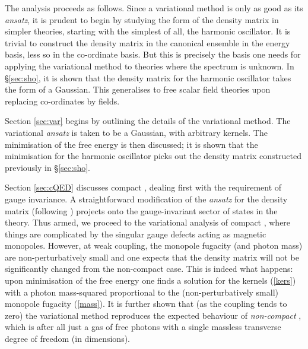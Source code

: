 \documentclass[a4paper,a4paper]{article}
\begin{document}
The analysis proceeds as follows. Since a variational method is only as good as its \emph{ansatz},
it is prudent to begin by studying the form of the density matrix in simpler theories, 
starting with the simplest of all, the harmonic oscillator. It is trivial to construct the density matrix in the
canonical ensemble in the energy basis, less so in the co-ordinate basis. 
But this is precisely the basis one needs for applying the variational method to theories where the spectrum is unknown. 
In \S\ref{sec:sho}, it is shown that the density matrix for the harmonic oscillator takes the form of a Gaussian.
This generalises to free scalar field theories upon replacing co-ordinates by fields.

Section \ref{sec:var} begins by outlining the details of the variational method. 
The variational \emph{ansatz} is taken to be a Gaussian, with arbitrary kernels. 
The minimisation of the free energy is then discussed; it is shown that the minimisation for the harmonic oscillator
picks out the density matrix constructed previously in \S\ref{sec:sho}. 

Section \ref{sec:cQED} discusses compact \coordHE{}, dealing first
with the requirement of gauge invariance.
A straightforward modification of the \emph{ansatz} for the density matrix (following \cite{Kogan:2002yr}) projects
onto the gauge-invariant sector of states in the theory. 
Thus armed, we proceed to the variational analysis of compact \coordHE{}, where things are complicated by the singular gauge defects
acting as magnetic monopoles. However, at weak coupling, the monopole fugacity (and photon mass)
are non-perturbatively small and one expects
that the density matrix will not be significantly changed from the non-compact case. This is indeed what happens: upon minimisation
of the free energy one finds a solution for the kernels (\ref{kers}) with a photon mass-squared
proportional to the (non-perturbatively small) monopole fugacity (\ref{mass}). 
It is further shown that (as the coupling tends to zero) the
variational method reproduces the expected behaviour of 
\emph{non-compact} \coordHE{}, which is after all
just a gas of free photons with a single massless transverse degree of freedom (in \coordHE{} dimensions).
\end{document}
